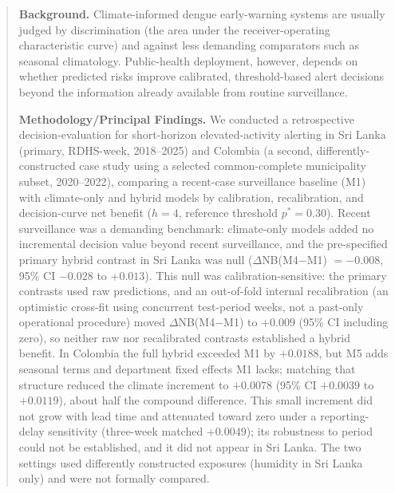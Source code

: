\documentclass[11pt,a4paper]{article}
\begin{document}
\begin{abstract}
\noindent\textbf{Background.}
Climate-informed dengue early-warning systems are usually judged by discrimination (the area under the receiver-operating characteristic curve) and against less demanding comparators such as seasonal climatology. Public-health deployment, however, depends on whether predicted risks improve calibrated, threshold-based alert decisions beyond the information already available from routine surveillance.

\noindent\textbf{Methodology/Principal Findings.}
We conducted a retrospective decision-evaluation for short-horizon elevated-activity alerting in Sri Lanka (primary, RDHS-week, 2018--2025) and Colombia (a second, differently-constructed case study using a selected common-complete municipality subset, 2020--2022), comparing a recent-case surveillance baseline (M1) with climate-only and hybrid models by calibration, recalibration, and decision-curve net benefit ($h=4$, reference threshold $p^*=0.30$). Recent surveillance was a demanding benchmark: climate-only models added no incremental decision value beyond recent surveillance, and the pre-specified primary hybrid contrast in Sri Lanka was null ($\Delta$NB(M4$-$M1) $=-0.008$, 95\% CI $-0.028$ to $+0.013$). This null was calibration-sensitive: the primary contrasts used raw predictions, and an out-of-fold internal recalibration (an optimistic cross-fit using concurrent test-period weeks, not a past-only operational procedure) moved $\Delta$NB(M4$-$M1) to $+0.009$ (95\% CI including zero), so neither raw nor recalibrated contrasts established a hybrid benefit. In Colombia the full hybrid exceeded M1 by $+0.0188$, but M5 adds seasonal terms and department fixed effects M1 lacks; matching that structure reduced the climate increment to $+0.0078$ (95\% CI $+0.0039$ to $+0.0119$), about half the compound difference. This small increment did not grow with lead time and attenuated toward zero under a reporting-delay sensitivity (three-week matched $+0.0049$); its robustness to period could not be established, and it did not appear in Sri Lanka. The two settings used differently constructed exposures (humidity in Sri Lanka only) and were not formally compared.


\end{abstract}
\end{document}
